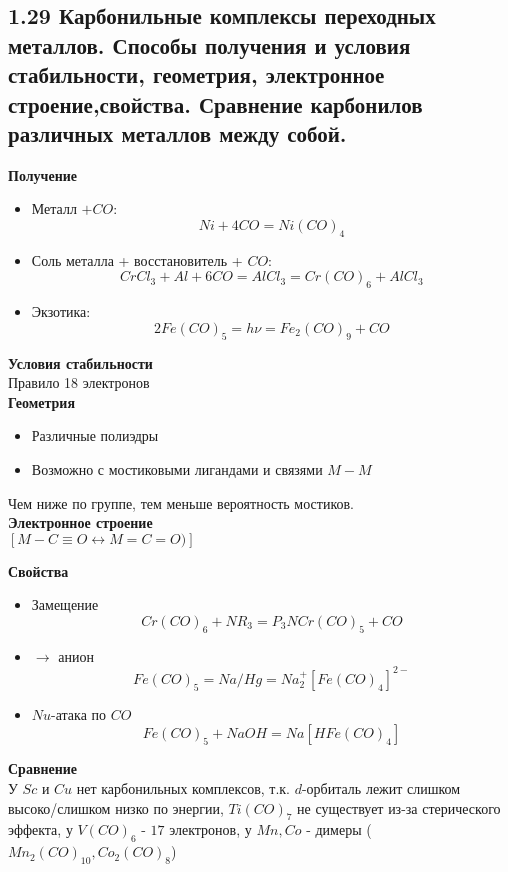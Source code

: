 \subsection{1.29 Карбонильные комплексы переходных металлов. Способы получения и условия стабильности, геометрия, электронное строение,свойства. Сравнение карбонилов различных металлов между собой.}
\textbf{Получение}\\
\begin{itemize}
	\item Металл $+ CO$:
	\[
	Ni + 4CO = Ni(CO)_4
	\]
	\item Соль металла + восстановитель + $CO$:
	\[
	CrCl_3 + Al + 6CO = AlCl_3 = Cr(CO)_6 + AlCl_3
	\]
	\item Экзотика: 
	\[
	2Fe(CO)_5 = h\nu = Fe_2(CO)_9 + CO
	\]
\end{itemize}
\textbf{Условия стабильности}\\
Правило 18 электронов \\
\textbf{Геометрия}\\
\begin{figure} [H]
	\centering {\texttt{[image: dd2]}}
\end{figure}
\begin{itemize}
	\item Различные полиэдры
	\item Возможно с мостиковыми лигандами и связями $M-M$
\end{itemize}
\begin{figure} [H]
	\centering {\texttt{[image: dd3]}}
\end{figure}
Чем ниже по группе, тем меньше вероятность мостиков. \\
\textbf{Электронное строение}\\
$\left[ M-C\equiv O \leftrightarrow M = C = O ) \right]$ \\
\begin{figure} [H]
	\centering {\texttt{[image: dd4]}}
\end{figure}
\textbf{Свойства}\\
\begin{itemize}
	\item Замещение
	\[
	Cr(CO)_6 + NR_3 = P_3NCr(CO)_5 + CO
	\]
	\item $\rightarrow $ анион
	\[
	Fe(CO)_5 = Na/Hg = Na_2^{+} \left[Fe(CO)_4 \right]^{2-}
 	\]
	\item $Nu$-атака по $CO$
	\[
	Fe(CO)_5 + NaOH = Na \left[ HFe(CO)_4 \right]
	\]
\end{itemize}
\textbf{Сравнение}\\
У $Sc$ и $Cu$ нет карбонильных комплексов, т.к. $d$-орбиталь лежит слишком высоко/слишком низко по энергии, $Ti(CO)_7$ не существует из-за стерического эффекта, у $V(CO)_6$ - $17$ электронов, у $Mn, Co$ - димеры ($Mn_2(CO)_{10}, Co_2(CO)_8$) 



